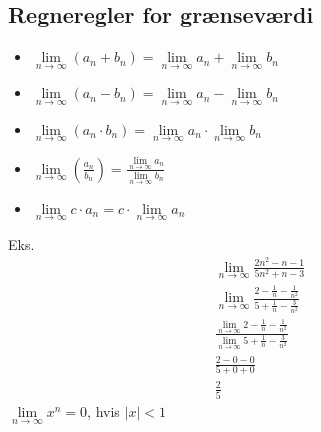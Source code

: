 \documentclass[12pt, a4paper]{article}
\begin{document}
	\subsection{Regneregler for grænseværdi}
		\begin{itemize}
			\item $\lim\limits_{n\rightarrow\infty}(a_n+b_n)= \lim\limits_{n\rightarrow\infty} a_n + \lim\limits_{n\rightarrow\infty} b_n$\\
			\item  $\lim\limits_{n\rightarrow\infty}(a_n-b_n)= \lim\limits_{n\rightarrow\infty} a_n - \lim\limits_{n\rightarrow\infty} b_n$\\
			\item  $\lim\limits_{n\rightarrow\infty}(a_n\cdot b_n)= \lim\limits_{n\rightarrow\infty} a_n \cdot \lim\limits_{n\rightarrow\infty} b_n$\\
			\item  $\lim\limits_{n\rightarrow\infty}(\frac{a_n}{b_n})= \frac{\lim\limits_{n\rightarrow\infty} a_n}{ \lim\limits_{n\rightarrow\infty} b_n}$
			\item $\lim\limits_{n\rightarrow \infty}c\cdot a_n = c\cdot \lim\limits_{n\rightarrow\infty}a_n$
		\end{itemize}
		Eks.
		\begin{align*}
			\lim\limits_{n\rightarrow\infty}\frac{2n^2-n-1}{5n^2+n-3}\\
			\lim\limits_{n\rightarrow\infty}\frac{2-\frac{1}{n}-\frac{1}{n^2}}{5+\frac{1}{n}-\frac{3}{n^2}}\\
			\frac{\lim\limits_{n\rightarrow\infty}2-\frac{1}{n}-\frac{1}{n^2}}{\lim\limits_{n\rightarrow\infty}5+\frac{1}{n}-\frac{3}{n^2}}\\
			\frac{2-0-0}{5+0+0}\\
			\frac{2}{5}
		\end{align*}
		$\lim\limits_{n\rightarrow\infty}x^n=0$, hvis $|x|<1$\\
\end{document}

